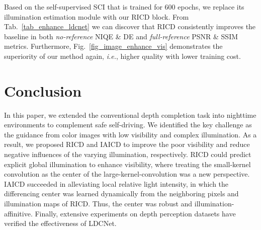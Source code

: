 \documentclass[lettersize,journal]{IEEEtran}
\begin{document}
Based on the self-supervised SCI \cite{ma2022toward} that is trained for $600$ epochs, we replace its illumination estimation module with our RICD block. From Tab.~\ref{tab_enhance_ldcnet} we can discover that RICD consistently improves the baseline in both \emph{no-reference} NIQE \cite{wang2013naturalness} \& DE \cite{shannon1948mathematical} and \emph{full-reference} PSNR \& SSIM metrics. Furthermore, Fig.~\ref{fig_image_enhance_vis} demonstrates the superiority of our method again, \emph{i.e.}, higher quality with lower training cost. 



\section{Conclusion}
In this paper, we extended the conventional depth completion task into nighttime environments to complement safe self-driving. We identified the key challenge as the guidance from color images with low visibility and complex illumination. As a result, we proposed RICD and IAICD to improve the poor visibility and reduce negative influences of the varying illumination, respectively. RICD could predict explicit global illumination to enhance visibility, where treating the small-kernel convolution as the center of the large-kernel-convolution was a new perspective. IAICD succeeded in alleviating local relative light intensity, in which the differencing center was learned dynamically from the neighboring pixels and illumination maps of RICD. Thus, the center was robust and illumination-affinitive. Finally, extensive experiments on depth perception datasets have verified the effectiveness of LDCNet. 








\end{document}
